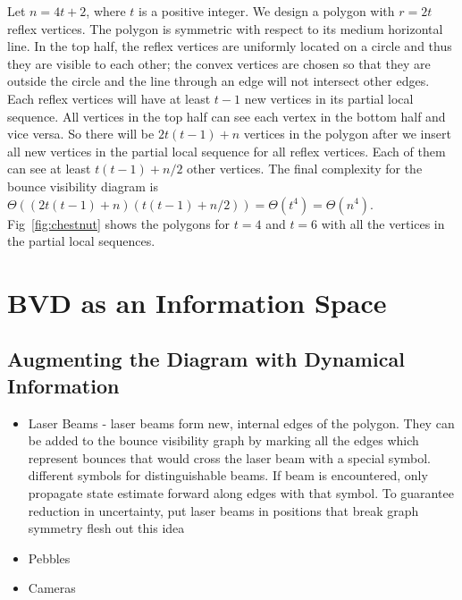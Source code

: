 \documentclass[letterpaper, 10 pt, conference]{ieeeconf}  %
\begin{document}
Let $n = 4t+2$, where $t$ is a positive integer. We design a polygon with $r = 2t$ reflex vertices. The polygon is symmetric with respect to its medium horizontal line. In the top half, the reflex vertices are uniformly located on a circle and thus they are visible to each other; the convex vertices are chosen so that they are outside the circle and the line through an edge will not intersect other edges. Each reflex vertices will have at least $t-1$ new vertices in its partial local sequence. All vertices in the top half can see each vertex in the bottom half and vice versa. So there will be $2t(t-1)+n$ vertices in the polygon after we insert all new vertices in the partial local sequence for all reflex vertices. Each of them can see at least $t(t-1)+n/2$ other vertices. The final complexity for the bounce visibility diagram is $\Theta ((2t(t-1)+n)(t(t-1)+n/2)) = \Theta (t^4) = \Theta(n^4)$. Fig~\ref{fig:chestnut} shows the polygons for $t = 4$ and $t=6$ with all the vertices in the partial local sequences.


\section{BVD as an Information Space}

\subsection{Augmenting the Diagram with Dynamical Information}

\begin{itemize}
\item Laser Beams - laser beams form new, internal edges of the polygon. They can be added to the bounce visibility graph by marking all the edges which represent bounces that would cross the laser beam with a special symbol. different symbols for distinguishable beams. If beam is encountered, only propagate state estimate forward along edges with that symbol. To guarantee reduction in uncertainty, put laser beams in positions that break graph symmetry {\color{red} flesh out this idea}
\item Pebbles
\item Cameras
\end{itemize}
\end{document}
